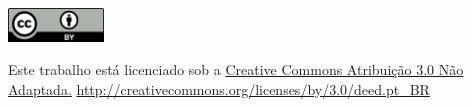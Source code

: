 \null
\vfill
\begin{center}
  \includegraphics[width=1in]{figure/cc-by.pdf}
  \label{fig:cc}
  
  Este trabalho está licenciado sob a
  \href{http://creativecommons.org/licenses/by/3.0/deed.pt_BR}{Creative Commons
  Atribuição 3.0 Não Adaptada.}
  \url{http://creativecommons.org/licenses/by/3.0/deed.pt_BR}
\end{center}
